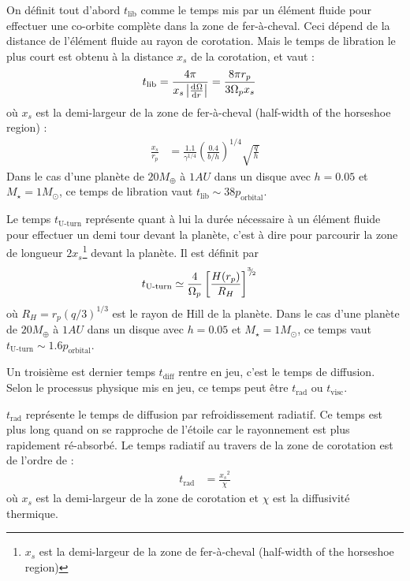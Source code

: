 On définit tout d'abord $t_\text{lib}$ comme le temps mis par un élément fluide pour effectuer une co-orbite complète dans la zone de fer-à-cheval. Ceci dépend de la distance de l'élément fluide au rayon de corotation. Mais le temps de libration le plus court est obtenu à la distance $x_s$ de la corotation, et vaut \citep[eq. (52)]{baruteau2008corotation} : 
\begin{align}
t_\text{lib} &= \frac{4\pi}{x_s\abs{\od{\Omega}{r}}} = \frac{8\pi r_p}{3\Omega_p x_s}
\end{align}
où $x_s$ est la demi-largeur de la zone de fer-à-cheval (\og half-width of the horseshoe region\fg) \citep[eq. (44)]{paardekooper2010torque} :
\begin{align}
\frac{x_s}{r_p} &= \frac{1.1}{\gamma^{1/4}} \left(\frac{0.4}{b/h}\right)^{1/4} \sqrt{\frac{q}{h}}
\end{align}
Dans le cas d'une planète de $20\unit{M_\oplus}$ à $1\unit{AU}$ dans un disque avec $h=0.05$ et $M_\star=1M_\odot$, ce temps de libration vaut $t_\text{lib}\sim 38 p_\text{orbital}$. 

Le temps $t_\text{U-turn}$ représente quant à lui la durée nécessaire à un élément fluide pour effectuer un demi tour devant la planète, c'est à dire pour parcourir la zone de longueur $2x_s$\footnote{$x_s$ est la demi-largeur de la zone de fer-à-cheval (\og half-width of the horseshoe region\fg)} devant la planète. Il est définit par \citep[eq. (64)]{baruteau2008corotation}
\begin{align}
t_\text{U-turn} &\simeq \frac{4}{\Omega_p}\left[\frac{H(r_p)}{R_H}\right]^{{}^{3\!\!}/ _{\!2}}
\end{align}
où $R_H=r_p (q/3)^{1/3}$ est le rayon de Hill de la planète. Dans le cas d'une planète de $20\unit{M_\oplus}$ à $1\unit{AU}$ dans un disque avec $h=0.05$ et $M_\star=1M_\odot$, ce temps vaut $t_\text{U-turn} \sim 1.6 p_\text{orbital}$.

Un troisième est dernier temps $t_\text{diff}$ rentre en jeu, c'est le temps de diffusion. Selon le processus physique mis en jeu, ce temps peut être $t_\text{rad}$ ou $t_\text{visc}$.

$t_\text{rad}$ représente le temps de diffusion par refroidissement radiatif. Ce temps est plus long quand on se rapproche de l'étoile car le rayonnement est plus rapidement ré-absorbé. Le temps radiatif au travers de la zone de corotation est de l'ordre de :
\begin{align}
t_\text{rad} &= \frac{{x_s}^2}{\chi}
\end{align}
où $x_s$ est la demi-largeur de la zone de corotation et $\chi$ est la diffusivité thermique.
 
